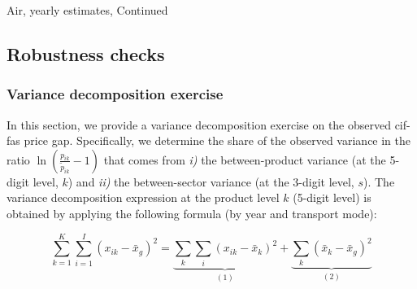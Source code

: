 \documentclass[11pt,twoside, authoryear]{elsarticle}
\begin{document}
\begin{landscape}
\begin{table}[htbp]
\begin{center}
\end{center}
\label{tab_oa:result_air_ally3}%
\end{table}%

\end{landscape}


\setcounter{table}{1}

\begin{table}[htbp]

\caption{Air, yearly estimates, Continued}
\begin{center}
	
	
	
\end{center}
\label{tab_oa:result_air_ally3}%
\end{table}%


\subsection{Robustness checks}


\subsubsection{Variance decomposition exercise \label{app:decomp_variance}}

In this section, we provide a variance decomposition exercise on the observed cif-fas price gap.
Specifically, we determine the share of the observed variance in the ratio $\ln(\frac{p_{ik}}{\widetilde{p}_{ik}}-1)$ that comes from \textit{i)} the between-product variance (at the 5-digit level, $k$) and \textit{ii)} the between-sector variance (at the 3-digit level, $s$).
The variance decomposition expression at the product level $k$ (5-digit level) is obtained by applying the following formula (by year and transport mode):

$$\sum_{k=1}^K \sum_{i=1}^I \left(x_{ik} - \bar{x}_g  \right)^2 = \underbrace{\sum_k \sum_i \left(x_{ik} - \bar{x}_k  \right)^2}_{(1)} + \underbrace{\sum_k \left(\bar{x}_{k} - \bar{x}_g  \right)^2}_{(2)}$$
\end{document}
